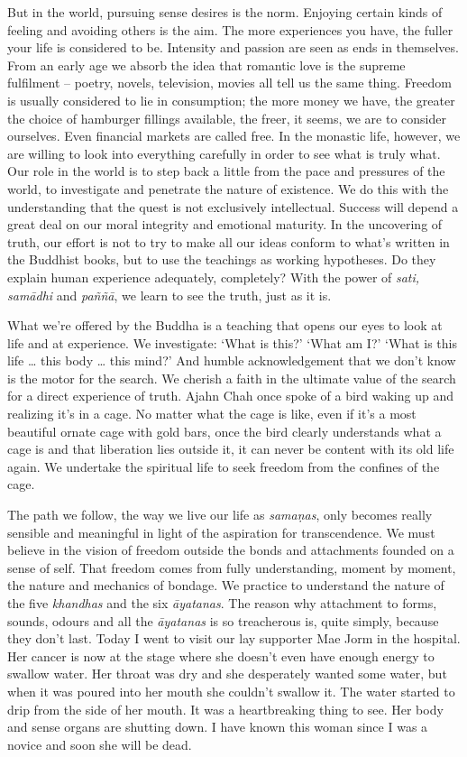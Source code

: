 But in the world, pursuing sense desires is the norm. Enjoying certain
kinds of feeling and avoiding others is the aim. The more experiences
you have, the fuller your life is considered to be. Intensity and
passion are seen as ends in themselves. From an early age we absorb the
idea that romantic love is the supreme fulfilment -- poetry, novels, 
television, movies all tell us the same thing. Freedom is usually
considered to lie in consumption; the more money we have, the greater
the choice of hamburger fillings available, the freer, it seems, we are
to consider ourselves. Even financial markets are called free. In the
monastic life, however, we are willing to look into everything carefully
in order to see what is truly what. Our role in the world is to step
back a little from the pace and pressures of the world, to investigate
and penetrate the nature of existence. We do this with the understanding
that the quest is not exclusively intellectual. Success will depend a
great deal on our moral integrity and emotional maturity. In the
uncovering of truth, our effort is not to try to make all our ideas
conform to what's written in the Buddhist books, but to use the
teachings as working hypotheses. Do they explain human experience
adequately, completely? With the power of \emph{sati, samādhi} and
\emph{paññā}, we learn to see the truth, just as it is. 

What we're offered by the Buddha is a teaching that opens our eyes to
look at life and at experience. We investigate: `What is this?' `What am
I?' `What is this life \ldots{} this body \ldots{} this mind?' And
humble acknowledgement that we don't know is the motor for the search. 
We cherish a faith in the ultimate value of the search for a direct
experience of truth. Ajahn Chah once spoke of a bird waking up and
realizing it's in a cage. No matter what the cage is like, even if it's
a most beautiful ornate cage with gold bars, once the bird clearly
understands what a cage is and that liberation lies outside it, it can
never be content with its old life again. We undertake the spiritual
life to seek freedom from the confines of the cage. 

The path we follow, the way we live our life as \emph{samaṇas}, only
becomes really sensible and meaningful in light of the aspiration for
transcendence. We must believe in the vision of freedom outside the
bonds and attachments founded on a sense of self. That freedom comes
from fully understanding, moment by moment, the nature and mechanics of
bondage. We practice to understand the nature of the five
\emph{khandhas} and the six \emph{āyatanas}. The reason why attachment
to forms, sounds, odours and all the \emph{āyatanas} is so treacherous
is, quite simply, because they don't last. Today I went to visit our lay
supporter Mae Jorm in the hospital. Her cancer is now at the stage where
she doesn't even have enough energy to swallow water. Her throat was dry
and she desperately wanted some water, but when it was poured into her
mouth she couldn't swallow it. The water started to drip from the side
of her mouth. It was a heartbreaking thing to see. Her body and sense
organs are shutting down. I have known this woman since I was a novice
and soon she will be dead. 

